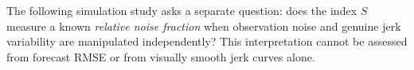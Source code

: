 The following simulation study asks
a separate question: does
the index $S$ measure a known
\emph{relative noise fraction}
when observation noise and genuine
jerk variability are manipulated
independently? This interpretation
cannot be assessed from forecast
RMSE or from visually smooth
jerk curves alone.
